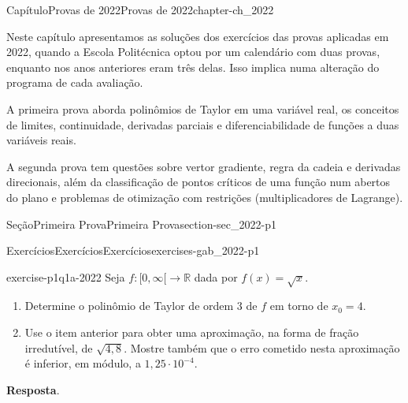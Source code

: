 \documentclass[oneside,10pt,]{book}
\newcommand{\blocktitlefont}{\relax}
\numberwithin{equation}{section}
\newcommand{\R}{\mathbb R}
\begin{document}
%
%
\typeout{************************************************}
\typeout{************************************************}
%
\begin{chapterptx}{Capítulo}{Provas de 2022}{}{Provas de 2022}{}{}{chapter-ch_2022}
\renewcommand*{\chaptername}{Capítulo}
\begin{introduction}{}%
Neste capítulo apresentamos as soluções dos exercícios das provas aplicadas em 2022, quando a Escola Politécnica optou por um calendário com duas provas, enquanto nos anos anteriores eram três delas. Isso implica numa alteração do programa de cada avaliação.%
\par
A primeira prova aborda polinômios de Taylor em uma variável real, os conceitos de limites, continuidade, derivadas parciais e diferenciabilidade de funções a duas variáveis reais.%
\par
A segunda prova tem questões sobre vertor gradiente, regra da cadeia e derivadas direcionais, além da classificação de pontos críticos de uma função num abertos do plano e problemas de otimização com restrições (multiplicadores de Lagrange).%
\end{introduction}%
%
%
\typeout{************************************************}
\typeout{************************************************}
%
\begin{sectionptx}{Seção}{Primeira Prova}{}{Primeira Prova}{}{}{section-sec_2022-p1}
%
%
\typeout{************************************************}
\typeout{************************************************}
%
\begin{exercises-subsection-numberless}{Exercícios}{Exercícios}{}{Exercícios}{}{}{exercises-gab_2022-p1}
\begin{divisionexercise}{1}{}{}{exercise-p1q1a-2022}%
Seja \(f\colon[0,\infty[\to\R\) dada por \(f(x)=\sqrt{x}\).%
\begin{enumerate}[label=\alph*]
\item{}Determine o polinômio de Taylor de ordem \(3\) de \(f\) em torno de \(x_0=4\).%
\item{}Use o item anterior para obter uma aproximação, na forma de fração irredutível, de \(\sqrt{4,8}\). Mostre também que o erro cometido nesta aproximação é inferior, em módulo, a \(1,25\cdot 10^{-4}\).%
\end{enumerate}
%
\par\smallskip%
\noindent\textbf{\blocktitlefont Resposta}.\hypertarget{answer-p1q1a-2022-b}{}\quad{}%

\end{divisionexercise}
\end{exercises-subsection-numberless}
\end{sectionptx}
\end{chapterptx}
\end{document}
